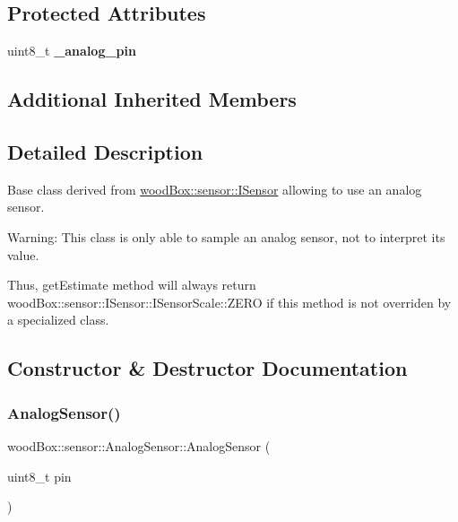 \subsection*{Protected Attributes}
\begin{DoxyCompactItemize}
\item 
\mbox{\label{classwood_box_1_1sensor_1_1_analog_sensor_a0377173a16668660f492c52694f96fab}} 
uint8\+\_\+t {\bfseries \+\_\+analog\+\_\+pin}
\end{DoxyCompactItemize}
\subsection*{Additional Inherited Members}


\subsection{Detailed Description}
Base class derived from \mbox{\hyperlink{classwood_box_1_1sensor_1_1_i_sensor}{wood\+Box\+::sensor\+::\+I\+Sensor}} allowing to use an analog sensor.

Warning\+: This class is only able to sample an analog sensor, not to interpret its value.

Thus, {\ttfamily get\+Estimate} method will always return wood\+Box\+::sensor\+::\+I\+Sensor\+::\+I\+Sensor\+Scale\+::\+Z\+E\+RO if this method is not overriden by a specialized class. 

\subsection{Constructor \& Destructor Documentation}
\mbox{\label{classwood_box_1_1sensor_1_1_analog_sensor_a41d8ff91cf91d2bdbccffe8f1316421b}} 
\subsubsection{\texorpdfstring{Analog\+Sensor()}{AnalogSensor()}}
{\footnotesize\ttfamily wood\+Box\+::sensor\+::\+Analog\+Sensor\+::\+Analog\+Sensor (\begin{DoxyParamCaption}\item[{uint8\+\_\+t}]{pin }\end{DoxyParamCaption})}

